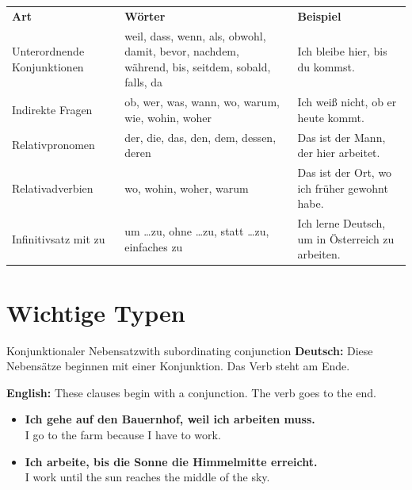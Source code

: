 \documentclass[a4paper,11pt]{article}
\newcommand{\GermanText}[1]{\textbf{Deutsch: }#1\par}
\newcommand{\EnglishText}[1]{{\small\color{SoftGray}\textbf{English: }#1\par}}
\newcommand{\ExampleItem}[2]{\item \textbf{#1}\\{\small\color{SoftGray}#2}}
\begin{document}
        \begin{tabular}{>{\raggedright\arraybackslash}p{}
                >{\raggedright\arraybackslash}p{}
                >{\raggedright\arraybackslash}p{}}
            \rowcolor{HeaderBlueDark}
            {\color{white}\bfseries Art} &
                {\color{white}\bfseries Wörter} &
                {\color{white}\bfseries Beispiel} \\
            
            Unterordnende Konjunktionen &
            weil, dass, wenn, als, obwohl, damit, bevor, nachdem, während, bis, seitdem, sobald, falls, da &
            Ich bleibe hier, bis du kommst. \\
            
            Indirekte Fragen &
            ob, wer, was, wann, wo, warum, wie, wohin, woher &
            Ich weiß nicht, ob er heute kommt. \\
            
            Relativpronomen &
            der, die, das, den, dem, dessen, deren &
            Das ist der Mann, der hier arbeitet. \\
            
            Relativadverbien &
            wo, wohin, woher, warum &
            Das ist der Ort, wo ich früher gewohnt habe. \\
            
            Infinitivsatz mit zu &
            um \ldots zu, ohne \ldots zu, statt \ldots zu, einfaches zu &
            Ich lerne Deutsch, um in Österreich zu arbeiten. \\
        \end{tabular}
    
    
    \section{Wichtige Typen}
        
        \begin{grammarentry}{Konjunktionaler Nebensatz}{with subordinating conjunction}
            \GermanText{Diese Nebensätze beginnen mit einer Konjunktion. Das Verb steht am Ende.}
            \EnglishText{These clauses begin with a conjunction. The verb goes to the end.}
            
            \begin{exbox}
                \begin{itemize}
                    \ExampleItem{Ich gehe auf den Bauernhof, weil ich arbeiten muss.}{I go to the farm because I have to work.}
                    \ExampleItem{Ich arbeite, bis die Sonne die Himmelmitte erreicht.}{I work until the sun reaches the middle of the sky.}
                \end{itemize}
            \end{exbox}
        \end{grammarentry}
        
\end{document}
